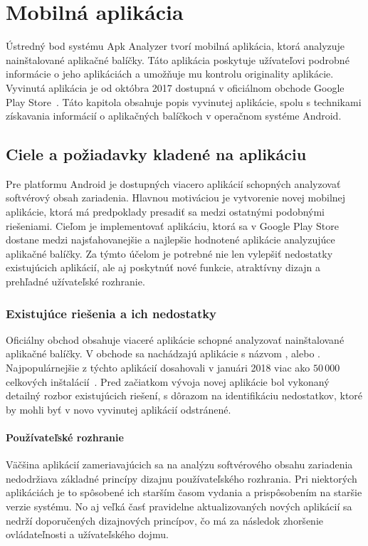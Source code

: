 \chapter{Mobilná aplikácia}
\label{chap:mobilna-aplikacia}

Ústredný bod systému Apk Analyzer tvorí mobilná aplikácia, ktorá analyzuje nainštalované aplikačné balíčky. Táto aplikácia poskytuje užívateľovi podrobné informácie o jeho aplikáciách a umožňuje mu kontrolu originality aplikácie. Vyvinutá aplikácia je od októbra 2017 dostupná v oficiálnom obchode Google Play Store~\cite{gp}. Táto kapitola obsahuje popis vyvinutej aplikácie, spolu s technikami získavania informácií o aplikačných balíčkoch v operačnom systéme Android.

\section{Ciele a požiadavky kladené na aplikáciu}
Pre platformu Android je dostupných viacero aplikácií schopných analyzovať softvérový obsah zariadenia. Hlavnou motiváciou je vytvorenie novej mobilnej aplikácie, ktorá má predpoklady presadiť sa medzi ostatnými podobnými riešeniami. Cieľom je implementovať aplikáciu, ktorá sa v Google Play Store dostane medzi najsťahovanejšie a najlepšie hodnotené aplikácie analyzujúce aplikačné balíčky. Za týmto účelom je potrebné nie len vylepšiť nedostatky existujúcich aplikácií, ale aj poskytnúť nové funkcie, atraktívny dizajn a prehľadné užívateľské rozhranie. 

\subsection{Existujúce riešenia a ich nedostatky}
Oficiálny obchod  obsahuje viaceré aplikácie schopné analyzovať nainštalované aplikačné balíčky. V obchode sa nachádzajú aplikácie s názvom ,  alebo . Najpopulárnejšie z týchto aplikácií dosahovali v januári 2018 viac ako $50\,000$ celkových inštalácií~\cite{kfOvdBmwje56iW6j}. Pred začiatkom vývoja novej aplikácie bol vykonaný detailný rozbor existujúcich riešení, s dôrazom na identifikáciu nedostatkov, ktoré by mohli byť v novo vyvinutej aplikácií odstránené.
\subsubsection{\textbf{Používateľské rozhranie}}
Väčšina aplikácií zameriavajúcich sa na analýzu softvérového obsahu zariadenia nedodržiava základné princípy dizajnu používateľského rozhrania. Pri niektorých aplikáciách je to spôsobené ich starším časom vydania a prispôsobením na staršie verzie systému. No aj veľká časť pravidelne aktualizovaných nových aplikácií sa nedrží doporučených dizajnových princípov, čo má za následok zhoršenie ovládateľnosti a užívateľského dojmu.

